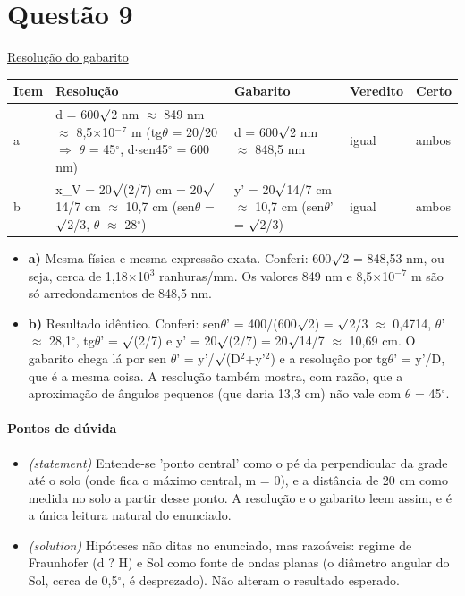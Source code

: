 \documentclass{article}%
\begin{document}
\section*{Questão 9}%
\href{https://poliedroresolve.sistemapoliedro.com.br/vestibulares/ita/2026/ita-2-fase-dia-3-30-10-2025-2-fase-dia-3/dissertativa-9-fisica-2-fase-dia-3-ita-2026}{Resolução do gabarito}\par\smallskip%
\begin{longtable}{@{}p{} p{} p{} p{} p{}@{}}\toprule Item & Resolução & Gabarito & Veredito & Certo \\ \midrule
a & d = 600$\surd$2 nm $\approx$ 849 nm $\approx$ 8,5$\times$10$^{-}$$^{7}$ m (tg$\theta$ = 20/20 $\Rightarrow$ $\theta$ = 45$^\circ$, d$\cdot$sen45$^\circ$ = 600 nm) & d = 600$\surd$2 nm $\approx$ 848,5 nm & igual & ambos \\
b & x\_V = 20$\surd$(2/7) cm = 20$\surd$14/7 cm $\approx$ 10,7 cm (sen$\theta$ = $\surd$2/3, $\theta$ $\approx$ 28$^\circ$) & y' = 20$\surd$14/7 cm $\approx$ 10,7 cm (sen$\theta$' = $\surd$2/3) & igual & ambos \\
\bottomrule\end{longtable}%
\begin{itemize}%
\item%
\textbf{a)} Mesma física e mesma expressão exata. Conferi: 600$\surd$2 = 848,53 nm, ou seja, cerca de 1,18$\times$10$^3$ ranhuras/mm. Os valores 849 nm e 8,5$\times$10$^{-}$$^{7}$ m são só arredondamentos de 848,5 nm.%
\item%
\textbf{b)} Resultado idêntico. Conferi: sen$\theta$' = 400/(600$\surd$2) = $\surd$2/3 $\approx$ 0,4714, $\theta$' $\approx$ 28,1$^\circ$, tg$\theta$' = $\surd$(2/7) e y' = 20$\surd$(2/7) = 20$\surd$14/7 $\approx$ 10,69 cm. O gabarito chega lá por sen $\theta$' = y'/$\surd$(D$^2$+y'$^2$) e a resolução por tg$\theta$' = y'/D, que é a mesma coisa. A resolução também mostra, com razão, que a aproximação de ângulos pequenos (que daria 13,3 cm) não vale com $\theta$ = 45$^\circ$.%
\end{itemize}%
\paragraph{Pontos de dúvida}%
\begin{itemize}%
\item%
\textit{(statement)} Entende{-}se 'ponto central' como o pé da perpendicular da grade até o solo (onde fica o máximo central, m = 0), e a distância de 20 cm como medida no solo a partir desse ponto. A resolução e o gabarito leem assim, e é a única leitura natural do enunciado.%
\item%
\textit{(solution)} Hipóteses não ditas no enunciado, mas razoáveis: regime de Fraunhofer (d ? H) e Sol como fonte de ondas planas (o diâmetro angular do Sol, cerca de 0,5$^\circ$, é desprezado). Não alteram o resultado esperado.%
\end{itemize}%
\end{document}
